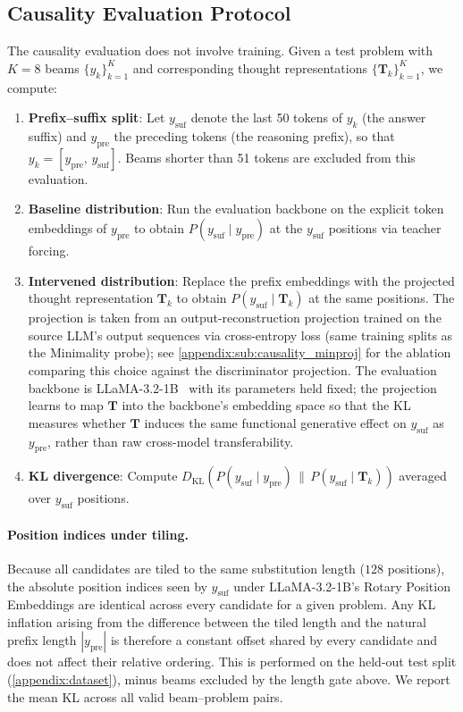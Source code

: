 \subsection{Causality Evaluation Protocol}
\label{appendix:sub:causality_eval}
The causality evaluation does not involve training.
Given a test problem with $K=8$ beams $\{y_k\}_{k=1}^K$ and
corresponding thought representations $\{\mathbf{T}_k\}_{k=1}^K$,
we compute:
\begin{enumerate}[nosep,leftmargin=1.5em]
  \item \textbf{Prefix--suffix split}: Let $y_{\mathrm{suf}}$ denote the last 50 tokens
        of $y_k$ (the answer suffix) and $y_{\mathrm{pre}}$ the preceding tokens (the
        reasoning prefix), so that $y_k = [y_{\mathrm{pre}},\, y_{\mathrm{suf}}]$.
        Beams shorter than 51 tokens are excluded from this evaluation.
  \item \textbf{Baseline distribution}: Run the evaluation backbone on the explicit
        token embeddings of $y_{\mathrm{pre}}$ to obtain
        $P(y_{\mathrm{suf}} \mid y_{\mathrm{pre}})$ at the $y_{\mathrm{suf}}$ positions
        via teacher forcing.
  \item \textbf{Intervened distribution}: Replace the prefix embeddings
        with the projected thought representation $\mathbf{T}_k$ to
        obtain $P(y_{\mathrm{suf}} \mid \mathbf{T}_k)$ at the same positions. The
        projection is taken from an output-reconstruction projection trained on the
        source LLM's output sequences via cross-entropy loss (same training splits as
        the Minimality probe); see \cref{appendix:sub:causality_minproj}
        for the ablation comparing this choice against the discriminator projection.
        The evaluation backbone is LLaMA-3.2-1B~\citep{grattafiori2024llama3herdmodels}
        with its parameters held fixed; the projection learns to map $\mathbf{T}$ into
        the backbone's embedding space so that the KL measures whether $\mathbf{T}$
        induces the same functional generative effect on $y_{\mathrm{suf}}$ as
        $y_{\mathrm{pre}}$, rather than raw cross-model transferability.
  \item \textbf{KL divergence}: Compute
        $D_\mathrm{KL}\!\left(P(y_{\mathrm{suf}} \mid y_{\mathrm{pre}}) \,\|\,
        P(y_{\mathrm{suf}} \mid \mathbf{T}_k)\right)$
        averaged over $y_{\mathrm{suf}}$ positions.
\end{enumerate}
\paragraph{Position indices under tiling.}
Because all candidates are tiled to the same substitution length ($128$ positions), the absolute position indices seen by $y_{\mathrm{suf}}$ under LLaMA-3.2-1B's Rotary Position Embeddings are identical across every candidate for a given problem. Any KL inflation arising from the difference between the tiled length and the natural prefix length $|y_{\mathrm{pre}}|$ is therefore a constant offset shared by every candidate and does not affect their relative ordering.
This is performed on the held-out test split (\cref{appendix:dataset}),
minus beams excluded by the length gate above.
We report the mean KL across all valid beam--problem pairs.


